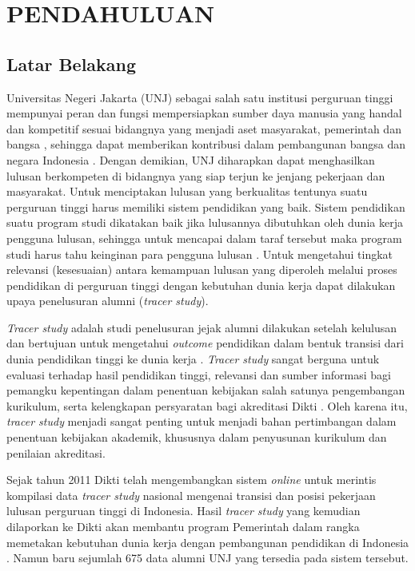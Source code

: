 
\chapter{PENDAHULUAN}

\section{Latar Belakang}
Universitas Negeri Jakarta (UNJ) sebagai salah satu institusi perguruan tinggi mempunyai peran dan fungsi mempersiapkan sumber daya manusia yang handal dan kompetitif sesuai bidangnya yang menjadi aset masyarakat, pemerintah dan bangsa , sehingga dapat memberikan kontribusi dalam pembangunan bangsa dan negara Indonesia \cite{BPAFMIPA}. Dengan demikian, UNJ diharapkan dapat menghasilkan lulusan berkompeten di bidangnya yang siap terjun ke jenjang pekerjaan dan masyarakat. Untuk menciptakan lulusan yang berkualitas tentunya suatu perguruan tinggi harus memiliki sistem pendidikan yang baik. Sistem pendidikan suatu program studi dikatakan baik jika lulusannya dibutuhkan oleh dunia kerja pengguna lulusan, sehingga untuk mencapai dalam taraf tersebut maka program studi harus tahu keinginan para pengguna lulusan \cite{EkoNursubiyantoro}. Untuk mengetahui tingkat relevansi (kesesuaian) antara kemampuan lulusan yang diperoleh melalui proses pendidikan di perguruan tinggi dengan kebutuhan dunia kerja dapat dilakukan upaya penelusuran alumni (\textit{tracer study}).

\textit{Tracer study} adalah studi penelusuran jejak alumni dilakukan setelah kelulusan dan bertujuan untuk mengetahui \textit{outcome} pendidikan dalam bentuk transisi dari dunia pendidikan tinggi ke dunia kerja \cite{ExploringTS}. \textit{Tracer study} sangat berguna untuk evaluasi terhadap hasil pendidikan tinggi, relevansi dan sumber informasi bagi pemangku kepentingan dalam penentuan kebijakan salah satunya pengembangan kurikulum, serta kelengkapan persyaratan bagi akreditasi Dikti \cite{RistekdiktiPanduan}. Oleh karena itu, \textit{tracer study} menjadi sangat penting untuk menjadi bahan pertimbangan dalam penentuan kebijakan akademik, khususnya dalam penyusunan kurikulum dan penilaian akreditasi.

Sejak tahun 2011 Dikti telah mengembangkan sistem \textit{online} untuk merintis kompilasi data \textit{tracer study} nasional mengenai transisi dan posisi pekerjaan lulusan perguruan tinggi di Indonesia. Hasil \textit{tracer study} yang kemudian dilaporkan ke Dikti akan membantu program Pemerintah dalam rangka memetakan kebutuhan dunia kerja dengan pembangunan pendidikan di Indonesia \cite{RistekdiktiWeb}. Namun baru sejumlah 675 data alumni UNJ yang tersedia pada sistem tersebut.

